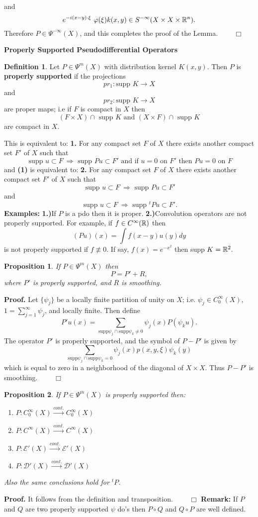 \documentclass[12pt,reqno]{amsart}
\theoremstyle{plain}  %
\newtheorem{proposition}{Proposition}
\theoremstyle{definition}
\newtheorem{definition}{Definition}
\newcommand{\nin}{\noindent}
\begin{document}
and
$$e^{-i(x-y)\cdot \xi}\  \varphi(\xi)k(x,y) \in S^{-\infty}(X \times X \times \Bbb
R^n).$$
Therefore  $P\in\Psi^{-\infty}(X)$, and this completes the proof of the
Lemma. $\qquad \Box$
\vskip0.2in
\centerline{\bf Properly Supported Pseudodifferential Operators}
\begin{definition} Let $P\in \Psi^m (X)$ with distribution kernel $K(x,y)$. 
Then  $P$ is {\bf properly supported} if the projections
$$pr_1 : \text{supp } K \longrightarrow X$$
and
$$pr_2 : \text{supp } K \longrightarrow X$$
are proper maps; i.e if $F$ is compact in $X$ then
$$(F \times X) \cap \text{ supp } K \text{ and } (X \times F) \cap \text{ supp } K$$
are compact in $X$.
\end{definition}
\nin
This is equivalent to:
\vskip0.1in
\nin
{\bf 1.} For  any  compact set $ F$ of $X$ there exists another compact
set  $F' $ of $X$ such that 
$$ \text{ supp }u\subset F \  \Longrightarrow \text{ supp }Pu\subset F'
\text{ and  if }  u =0\text{ on }F'\text{ then } Pu = 0  \text{ on  }F$$
and {\bf (1)} is equivalent to:
\vskip0.1in
\nin
{\bf 2.} For  any  compact set $ F$ of $X$ there exists another compact
set  $F' $ of $X$ such that 
$$ \text{ supp }u\subset F \  \Longrightarrow \text{ supp }Pu\subset F'$$
and
$$\text{ supp }u\subset F \  \Longrightarrow \text{ supp }{}^tPu\subset F'.$$
\nin
{\bf Examples:}
\vskip0.1in
\nin
{\bf 1.)}\quad If $P$ is a  pdo then it is proper. 
\vskip0.1in
\nin
{\bf 2.)}\quad Convolution operators are not properly supported. For example, if  $f \in C^\infty (\Bbb R) $ then 
$$ (Pu) (x) =\int f (x-y) u (y) dy $$
is not properly supported if $ f\not\equiv 0$. If say,
$f(x) = e^{-x^2}$  then supp  $K = \Bbb R^2.$
\begin{proposition} If $P \in \Psi^m (X)$ then
$$P = P' + R,$$
where $P' $ is properly supported, and $ R $ is smoothing.
\end{proposition}
\nin
{\bf Proof.} Let $\{\psi_j\}$ be a locally finite partition of unity on $X$;
i.e. $\psi_j \in C_0^\infty (X)$, 
$1 = \sum_{j=1}^{\infty} \psi_j$, and locally finite.
Then define
$$P' u (x) = \sum_{\text{supp} \psi_j \cap \text{supp} \psi_k \ne 0} \psi_j (x)
P(\psi_ku).$$ 
The  operator $P'$ is properly supported, and the symbol of $P - P'$ is given
by 
$$\sum_{\text{supp} \psi_j \cap \text{supp} \psi_k = 0} \psi_j (x) p(x, y, \xi)
\psi_k (y)$$ 
which is equal to zero in a neighborhood of the diagonal of $X \times X$. Thus
$P-P'$ is smoothing. $\qquad \Box$
\vskip0.1in
\begin{proposition} If $P \in \Psi^m (X)$ is properly supported then:
	\begin{enumerate}
		\item $P: C^\infty_0 (X) \xrightarrow{cont.} C_0^\infty (X)$
\item $P: C^\infty (X) \xrightarrow{cont.} C^\infty (X)$
\item $P: \mathcal E' (X) \xrightarrow{cont.} \mathcal E' (X)$
\item $P: \mathcal D'(X) \xrightarrow{cont.} \mathcal D' (X)$
\end{enumerate}
Also the same conclusions hold  for ${}^tP$.
\end{proposition}
\nin
{\bf Proof.} It follows from the definition and
 transposition. $\qquad \Box$
 \vskip0.1in
\noindent
{\bf Remark:  } If $P$ and  $Q$ are two properly supported
 $\psi$ do's then $P \circ Q$ and $Q \circ P$ are well defined.
\end{document}
